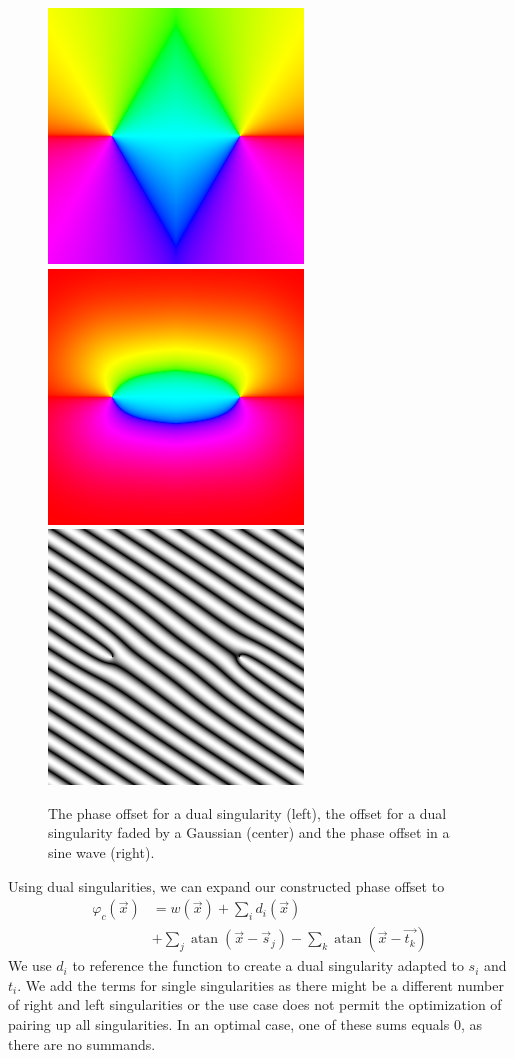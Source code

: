 \documentclass{utue} %
\DeclareMathOperator{\atan}{atan}
\begin{document}
\begin{figure}[ht]
  \centering
  \includegraphics[width=0.32\linewidth]{images/dualSingularityPhase}
  \hfill
  \includegraphics[width=0.32\linewidth]{images/dualSingularityFaded}
  \hfill
  \includegraphics[width=0.32\linewidth]{images/dualSingularitySineWave}
  \caption{The phase offset for a dual singularity (left), the offset for a dual singularity faded by a Gaussian (center) and the phase offset in a sine wave (right).}\label{fig:dualSingularity}
\end{figure}

Using dual singularities, we can expand our constructed phase offset to
\begin{align*}
  \varphi_c(\vec{x})&=w(\vec{x}) +\sum_i d_i(\vec{x})\\
  & + \sum_j \atan(\vec{x}-\vec{s}_j) - \sum_k \atan(\vec{x}-\vec{t_k})
\end{align*}
We use $d_i$ to reference the function to create a dual singularity adapted to $s_i$ and $t_i$. We add the terms for single singularities as there might be a different number of right and left singularities or the use case does not permit the optimization of pairing up all singularities. In an optimal case, one of these sums equals $0$, as there are no summands.
\end{document}
